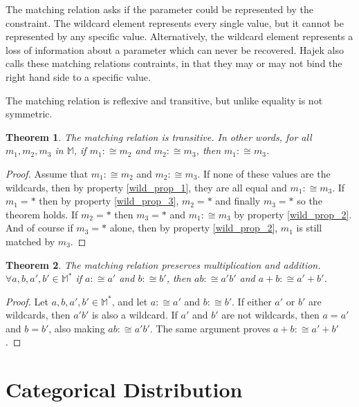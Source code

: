 \documentclass[twoside]{article}
\theoremstyle{plain}%
\newtheorem{theorem}{Theorem}[section]
\theoremstyle{definition}
\theoremstyle{remark}
\begin{document}
The matching relation asks if the parameter could be represented by the constraint. The wildcard element represents every single value, but it cannot be represented by any specific value. Alternatively, the wildcard element represents a loss of information about a parameter which can never be recovered. Hajek\cite{hajek} also calls these matching relations contraints, in that they may or may not bind the right hand side to a specific value.

The matching relation is reflexive and transitive, but unlike equality is not symmetric.

\begin{theorem}
The matching relation is transitive. In other words, for all \(m_1, m_2, m_3\) in \(\mathbb{M}\), if \(m_1 :\cong m_2\) and \(m_2 :\cong m_3\), then \(m_1 :\cong m_3\).
\end{theorem}

\begin{proof}
Assume that \(m_1 :\cong m_2\) and \(m_2 :\cong m_3\). If none of these values are the wildcards, then by property \ref{wild_prop_1}, they are all equal and \(m_1 :\cong m_3\). If \(m_1 = \ast\) then by property \ref{wild_prop_3}, \(m_2 = \ast\) and finally \(m_3 = \ast\) so the theorem holds. If \(m_2 = \ast\) then \(m_3 = \ast\) and \(m_1 :\cong m_3\) by property \ref{wild_prop_2}. And of course if \(m_3 = \ast\) alone, then by property \ref{wild_prop_2}, \(m_1\) is still matched by \(m_3\).
\end{proof}


\begin{theorem}
\label{theorem:matching_multiplication}
The matching relation preserves multiplication and addition. \(\forall a,b,a',b' \in \mathbb{M^*}\) if \(a :\cong a'\) and \(b :\cong b'\), then \(ab :\cong a'b'\) and \(a+b :\cong a'+b'\).
\end{theorem}

\begin{proof}
Let \(a,b,a',b' \in \mathbb{M^*}\), and let \(a :\cong a'\) and \(b :\cong b'\). If either \(a'\) or \(b'\) are wildcards, then \(a'b'\) is also a wildcard. If \(a'\) and \(b'\) are not wildcards, then \(a = a'\) and \(b = b'\), also making \(ab :\cong a'b'\). The same argument proves \(a+b :\cong a'+b'\).
\end{proof}

\section{Categorical Distribution}
\end{document}
